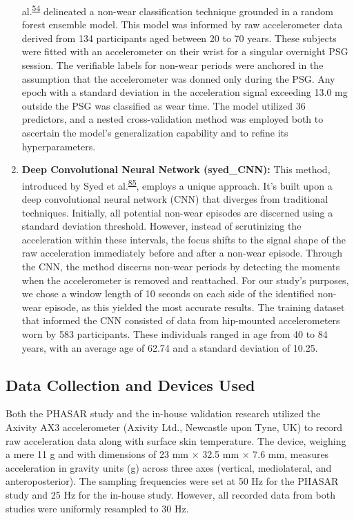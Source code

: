 \documentclass[
  9pt,
]{scrbook}
\begin{document}
\begin{enumerate}
  al.\textsuperscript{\protect\hyperlink{ref-sundararajan_sleep_2021}{54}}
  delineated a non-wear classification technique grounded in a random
  forest ensemble model. This model was informed by raw accelerometer
  data derived from 134 participants aged between 20 to 70 years. These
  subjects were fitted with an accelerometer on their wrist for a
  singular overnight PSG session. The verifiable labels for non-wear
  periods were anchored in the assumption that the accelerometer was
  donned only during the PSG. Any epoch with a standard deviation in the
  acceleration signal exceeding 13.0 mg outside the PSG was classified
  as wear time. The model utilized 36 predictors, and a nested
  cross-validation method was employed both to ascertain the model's
  generalization capability and to refine its hyperparameters.
\item
  \textsf{\textbf{Deep Convolutional Neural Network (syed\_CNN):}} This
  method, introduced by Syed et
  al.\textsuperscript{\protect\hyperlink{ref-syed_novel_2021}{85}},
  employs a unique approach. It's built upon a deep convolutional neural
  network (CNN) that diverges from traditional techniques. Initially,
  all potential non-wear episodes are discerned using a standard
  deviation threshold. However, instead of scrutinizing the acceleration
  within these intervals, the focus shifts to the signal shape of the
  raw acceleration immediately before and after a non-wear episode.
  Through the CNN, the method discerns non-wear periods by detecting the
  moments when the accelerometer is removed and reattached. For our
  study's purposes, we chose a window length of 10 seconds on each side
  of the identified non-wear episode, as this yielded the most accurate
  results. The training dataset that informed the CNN consisted of data
  from hip-mounted accelerometers worn by 583 participants. These
  individuals ranged in age from 40 to 84 years, with an average age of
  62.74 and a standard deviation of 10.25.
\end{enumerate}

\hypertarget{data-collection-and-devices-used}{%
\subsection{Data Collection and Devices
Used}\label{data-collection-and-devices-used}}

Both the PHASAR study and the in-house validation research utilized the
Axivity AX3 accelerometer (Axivity Ltd., Newcastle upon Tyne, UK) to
record raw acceleration data along with surface skin temperature. The
device, weighing a mere 11 g and with dimensions of 23 mm × 32.5 mm ×
7.6 mm, measures acceleration in gravity units (g) across three axes
(vertical, mediolateral, and anteroposterior). The sampling frequencies
were set at 50 Hz for the PHASAR study and 25 Hz for the in-house study.
However, all recorded data from both studies were uniformly resampled to
30 Hz.
\end{document}
